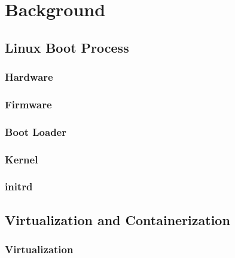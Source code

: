 
\chapter{Background}


\section{Linux Boot Process}

\subsection{Hardware}
\subsection{Firmware}
\subsection{Boot Loader}
\subsection{Kernel}
\subsection{initrd}


\section{Virtualization and Containerization}

\subsection{Virtualization}

